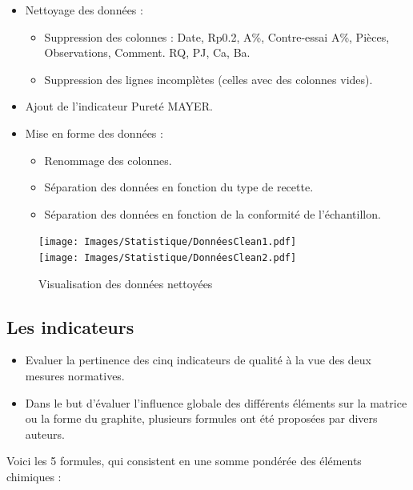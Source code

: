 \documentclass[12pt]{article}
\begin{document}
\begin{itemize}
\item Nettoyage des données :
\begin{itemize}
\item Suppression des colonnes : Date, Rp0.2, A\%, Contre-essai A\%, Pièces, Observations, Comment. RQ, PJ, Ca, Ba.
\item Suppression des lignes incomplètes (celles avec des colonnes vides).
\end{itemize}
\item Ajout de l'indicateur Pureté MAYER.
\item Mise en forme des données :
\begin{itemize}
\item Renommage des colonnes.
\item Séparation des données en fonction  du type de recette.
\item Séparation des données en fonction de la conformité de l'échantillon.
\end{itemize}
\end{itemize}
    


\begin{figure}[H]
    \centering
    \texttt{[image: Images/Statistique/DonnéesClean1.pdf]} \\
    \vspace{10pt}
    \texttt{[image: Images/Statistique/DonnéesClean2.pdf]}
    \caption{Visualisation des données nettoyées}
    \label{fig:donnees_nettoyees}
\end{figure}


\subsection{Les indicateurs}





\begin{itemize}
  \item  Evaluer la pertinence des cinq indicateurs de qualité à la vue des deux mesures normatives.
  \item Dans le but d'évaluer l'influence globale des différents éléments sur la matrice ou la forme du graphite, plusieurs formules ont été proposées par divers auteurs.
\end{itemize}

Voici les 5 formules, qui consistent en une somme pondérée des éléments chimiques :
\end{document}
